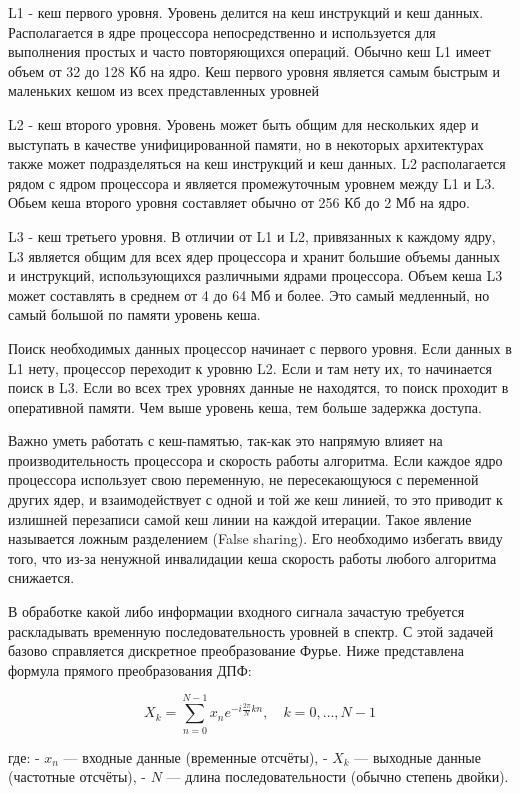 \documentclass[oneside]{book}
\begin{document}
L1 - кеш первого уровня.
Уровень делится на кеш инструкций и кеш данных.
Располагается в ядре процессора непосредственно и используется для выполнения простых и часто повторяющихся операций.
Обычно кеш L1 имеет объем от 32 до 128 Кб на ядро.
Кеш первого уровня является самым быстрым и маленьких кешом из всех представленных уровней

L2 - кеш второго уровня.
Уровень может быть общим для нескольких ядер и выступать в качестве унифицированной памяти, но в некоторых архитектурах также может подразделяться на кеш инструкций и кеш данных.
L2 располагается рядом с ядром процессора и является промежуточным уровнем между L1 и L3. 
Обьем кеша второго уровня составляет обычно от 256 Кб до 2 Мб на ядро.

L3 - кеш третьего уровня.
В отличии от L1 и L2, привязанных к каждому ядру, L3 является общим для всех ядер процессора и хранит большие объемы данных и инструкций, использующихся различными ядрами процессора.
Объем кеша L3 может составлять в среднем от 4 до 64 Мб и более.
Это самый медленный, но самый большой по памяти уровень кеша.

Поиск необходимых данных процессор начинает с первого уровня.
Если данных в L1 нету, процессор переходит к уровню L2.
Если и там нету их, то начинается поиск в L3.
Если во всех трех уровнях данные не находятся, то поиск проходит в оперативной памяти.
Чем выше уровень кеша, тем больше задержка доступа.

Важно уметь работать с кеш-памятью, так-как это напрямую влияет на производительность процессора и скорость работы алгоритма.
Если каждое ядро процессора использует свою переменную, не пересекающуюся с переменной других ядер, и взаимодействует с одной и той же кеш линией, то это приводит к излишней перезаписи самой кеш линии на каждой итерации.
Такое явление называется ложным разделением (False sharing).
Его необходимо избегать ввиду того, что из-за ненужной инвалидации кеша скорость работы любого алгоритма снижается.

В обработке какой либо информации входного сигнала зачастую требуется раскладывать временную последовательность уровней в спектр.
С этой задачей базово справляется дискретное преобразование Фурье.
Ниже представлена формула прямого преобразования ДПФ:

\[
X_k = \sum_{n=0}^{N-1} x_n e^{-i \frac{2\pi}{N} kn}, \quad k = 0, \dots, N-1
\]

где:
- \(x_n\) — входные данные (временные отсчёты),
- \(X_k\) — выходные данные (частотные отсчёты),
- \(N\) — длина последовательности (обычно степень двойки).
\end{document}
